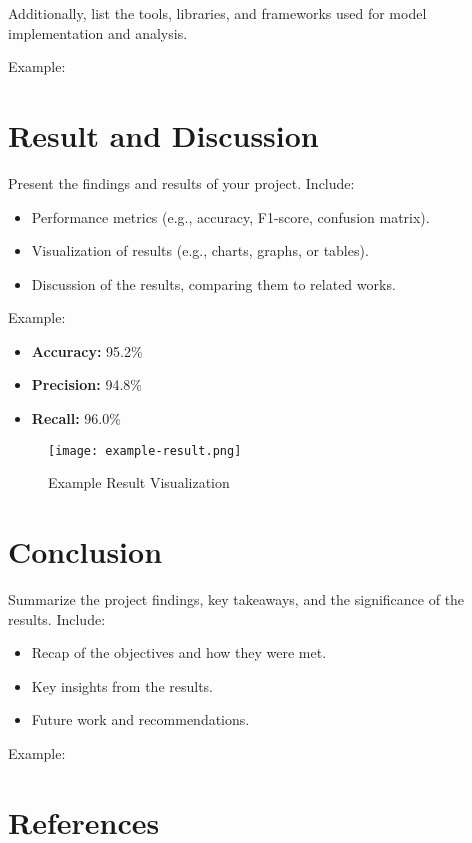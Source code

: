 \documentclass[12pt,a4paper]{article}
\begin{document}
Additionally, list the tools, libraries, and frameworks used for model implementation and analysis.

\noindent Example:
\lipsum[3] %

\section{Result and Discussion}
Present the findings and results of your project. Include:
\begin{itemize}
    \item Performance metrics (e.g., accuracy, F1-score, confusion matrix).
    \item Visualization of results (e.g., charts, graphs, or tables).
    \item Discussion of the results, comparing them to related works.
\end{itemize}

\noindent Example:
\begin{itemize}
    \item \textbf{Accuracy:} 95.2\%
    \item \textbf{Precision:} 94.8\%
    \item \textbf{Recall:} 96.0\%
\end{itemize}

\begin{figure}[h!]
    \centering
    \texttt{[image: example-result.png]} %
    \caption{Example Result Visualization}
    \label{fig:result}
\end{figure}

\section{Conclusion}
Summarize the project findings, key takeaways, and the significance of the results. Include:
\begin{itemize}
    \item Recap of the objectives and how they were met.
    \item Key insights from the results.
    \item Future work and recommendations.
\end{itemize}

\noindent Example:
\lipsum[4] %

\newpage
\section*{References}

\end{document}

